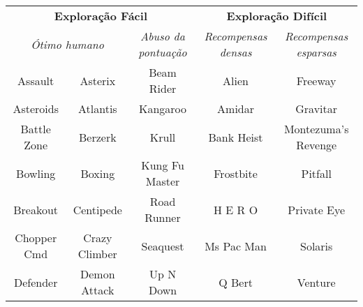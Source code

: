 \begin{tabular}{cc|c||c|c}
	\multicolumn{3}{c||}{\textbf{Exploração Fácil}}                      & \multicolumn{2}{c}{\textbf{Exploração Difícil}}         \\
	\multicolumn{2}{c|}{\emph{Ótimo humano}} & \emph{Abuso da pontuação} & \emph{Recompensas densas} & \emph{Recompensas esparsas} \\
	\hline
	Assault     & Asterix                    & Beam Rider                & Alien                     & Freeway                     \\
	Asteroids   & Atlantis                   & Kangaroo                  & Amidar                    & Gravitar                    \\
	Battle Zone & Berzerk                    & Krull                     & Bank Heist                & Montezuma's Revenge         \\
	Bowling     & Boxing                     & Kung Fu Master            & Frostbite                 & Pitfall                     \\
	Breakout    & Centipede                  & Road Runner               & H E R O                   & Private Eye                 \\
	Chopper Cmd & Crazy Climber              & Seaquest                  & Ms Pac Man                & Solaris                     \\
	Defender    & Demon Attack               & Up N Down                 & Q Bert                    & Venture                     \\
	\hline
\end{tabular}
